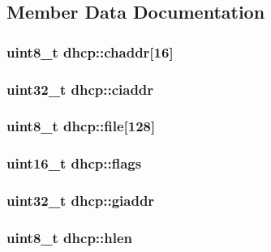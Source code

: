 \subsection{Member Data Documentation}
\hypertarget{structdhcp_a1e7bd991590e27ed159eb35fa5ae16a1}{}
\subsubsection[{chaddr}]{\setlength{\rightskip}{0pt plus 5cm}uint8\+\_\+t dhcp\+::chaddr\mbox{[}16\mbox{]}}\label{structdhcp_a1e7bd991590e27ed159eb35fa5ae16a1}
\hypertarget{structdhcp_a2f28f3c28fbb73c4ea35fa1b4db39a71}{}
\subsubsection[{ciaddr}]{\setlength{\rightskip}{0pt plus 5cm}uint32\+\_\+t dhcp\+::ciaddr}\label{structdhcp_a2f28f3c28fbb73c4ea35fa1b4db39a71}
\hypertarget{structdhcp_a3781bedf796fcc9bb89dd7bbbbe65a81}{}
\subsubsection[{file}]{\setlength{\rightskip}{0pt plus 5cm}uint8\+\_\+t dhcp\+::file\mbox{[}128\mbox{]}}\label{structdhcp_a3781bedf796fcc9bb89dd7bbbbe65a81}
\hypertarget{structdhcp_a21295bba2bb173c2da0a1b50a7215564}{}
\subsubsection[{flags}]{\setlength{\rightskip}{0pt plus 5cm}uint16\+\_\+t dhcp\+::flags}\label{structdhcp_a21295bba2bb173c2da0a1b50a7215564}
\hypertarget{structdhcp_a175defe50d079e97db3adc33b7df0860}{}
\subsubsection[{giaddr}]{\setlength{\rightskip}{0pt plus 5cm}uint32\+\_\+t dhcp\+::giaddr}\label{structdhcp_a175defe50d079e97db3adc33b7df0860}
\hypertarget{structdhcp_a9ff8f4981a4ef8c4a85e040208170066}{}
\subsubsection[{hlen}]{\setlength{\rightskip}{0pt plus 5cm}uint8\+\_\+t dhcp\+::hlen}\label{structdhcp_a9ff8f4981a4ef8c4a85e040208170066}
\hypertarget{structdhcp_ade25ac060b0d4cba12870a75b2443a4c}{}
